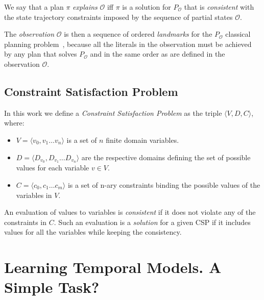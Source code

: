 \documentclass[runningheads]{llncs}
\newcommand{\tup}[1]{{\langle #1 \rangle}}
\begin{document}
\begin{definition}[Explanation]
We say that a plan $\pi$ {\em explains} $\mathcal{O}$ iff $\pi$ is a solution for $P_\mathcal{O}$ that is {\em consistent} with the state trajectory constraints imposed by the sequence of partial states $\mathcal{O}$. 
\end{definition}

The {\em observation} $\mathcal{O}$ is then a sequence of ordered {\em landmarks} for the $P_\mathcal{O}$ classical planning problem~\cite{hoffmann2004ordered}, because all the literals in the observation must be achieved by any plan that solves $P_\mathcal{O}$ and in the same order as are defined in the observation $\mathcal{O}$.


\subsection{Constraint Satisfaction Problem}
\label{sec:csp}

In this work we define a {\em Constraint Satisfaction Problem} as the triple $\tup{V,D,C}$, where:

\begin{itemize}

\item $V=\tup{v_0,v_1 \ldots v_n}$ is a set of $n$ finite domain variables.

\item $D=\tup{D_{v_0},D_{v_1} \ldots D_{v_n}}$ are the respective domains defining the set of possible values for each variable $v \in V$.

\item $C=\tup{c_0,c_1 \ldots c_m}$ is a set of n-ary constraints binding the possible values of the variables in $V$.

\end{itemize}

An evaluation of values to variables is {\em consistent} if it does not violate any of the constraints in $C$. Such an evaluation is a {\em solution} for a given CSP if it includes values for all the variables while keeping the consistency.


\section{Learning Temporal Models. A Simple Task?}
\label{sec:preliminarynotes}
\end{document}
